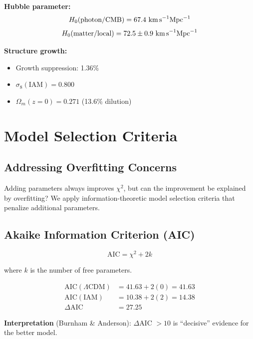 \documentclass[twocolumn,superscriptaddress,prl,amsmath,amssymb]{revtex4-2}
\begin{document}
\textbf{Hubble parameter:}
\begin{equation}
H_0(\text{photon/CMB}) = 67.4 \text{ km\,s}^{-1}\text{Mpc}^{-1}
\end{equation}
\begin{equation}
H_0(\text{matter/local}) = 72.5 \pm 0.9 \text{ km\,s}^{-1}\text{Mpc}^{-1}
\end{equation}

\textbf{Structure growth:}
\begin{itemize}
\item Growth suppression: 1.36\%
\item $\sigma_8(\text{IAM}) = 0.800$
\item $\Omega_m(z=0) = 0.271$ (13.6\% dilution)
\end{itemize}

\section{Model Selection Criteria}

\subsection{Addressing Overfitting Concerns}

Adding parameters always improves $\chi^2$, but can the improvement be explained by overfitting? We apply information-theoretic model selection criteria that penalize additional parameters.

\subsection{Akaike Information Criterion (AIC)}

\begin{equation}
\text{AIC} = \chi^2 + 2k
\end{equation}

where $k$ is the number of free parameters.

\begin{align}
\text{AIC}(\Lambda\text{CDM}) &= 41.63 + 2(0) = 41.63 \nonumber\\
\text{AIC}(\text{IAM}) &= 10.38 + 2(2) = 14.38 \nonumber\\
\Delta\text{AIC} &= 27.25
\end{align}

\textbf{Interpretation} (Burnham \& Anderson): $\Delta$AIC $> 10$ is ``decisive'' evidence for the better model.
\end{document}
